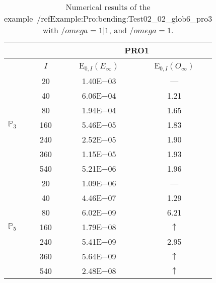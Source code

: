 \begin{table}[H]
\caption{Numerical results of the example~/ref{Example:Pro:bending:Test02_02_glob6_pro3} with $/omega=1|1$, and $/omega=1$.}
\setlength{\tabcolsep}{5pt}
\centering
\begin{tabular}{@{}l c c c@{}}
\toprule
 &  & \multicolumn{2}{c}{PRO1}\\
\midrule
 & $I$ & E$_{0,I}(E_{\infty})$ & E$_{0,I}(O_{\infty})$\\
\midrule
\multirow{7}{*}{$\mathbb{P}_{3}$}
 & 20 & 1.40E$-$03 & ---\\
 & 40 & 6.06E$-$04 & 1.21\\
 & 80 & 1.94E$-$04 & 1.65\\
 & 160 & 5.46E$-$05 & 1.83\\
 & 240 & 2.52E$-$05 & 1.90\\
 & 360 & 1.15E$-$05 & 1.93\\
 & 540 & 5.21E$-$06 & 1.96\\
\midrule
\multirow{7}{*}{$\mathbb{P}_{5}$}
 & 20 & 1.09E$-$06 & ---\\
 & 40 & 4.46E$-$07 & 1.29\\
 & 80 & 6.02E$-$09 & 6.21\\
 & 160 & 1.79E$-$08 & $\uparrow$\\
 & 240 & 5.41E$-$09 & 2.95\\
 & 360 & 5.64E$-$09 & $\uparrow$\\
 & 540 & 2.48E$-$08 & $\uparrow$\\
\bottomrule
\end{tabular}
\label{Table:PRO:test_02_02_test21_pro3}
\end{table}
